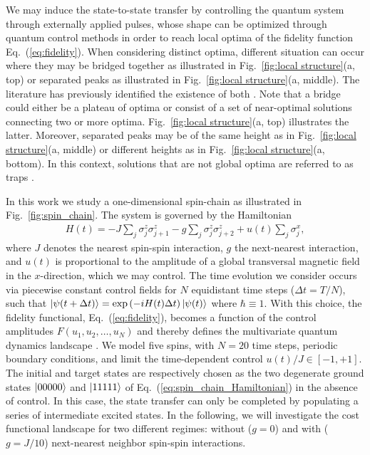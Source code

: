 \documentclass[aps, twocolumn,superscriptaddress]{revtex4-1}
\begin{document}
We may induce the state-to-state transfer by controlling the quantum system through externally applied pulses, whose shape can be optimized through quantum control methods in order to reach local optima of the fidelity function Eq.~(\ref{eq:fidelity}). When considering distinct optima, different situation can occur where they may be bridged together as illustrated in Fig.~\ref{fig:local structure}(a, top) or separated peaks as illustrated in Fig.~\ref{fig:local structure}(a, middle). The literature has previously identified the existence of both \cite{Larocca_2018, heck2018remote, larocca2020exploiting}. Note that a bridge could either be a plateau of optima or consist of a set of near-optimal solutions connecting two or more optima. Fig.~\ref{fig:local structure}(a, top) illustrates the latter. Moreover, separated peaks may be of the same height as in Fig.~\ref{fig:local structure}(a, middle) or different heights as in Fig.~\ref{fig:local structure}(a, bottom). In this context, solutions that are not global optima are referred to as traps \cite{rabitz2004quantum,pechen2011there, caneva2011chopped,de2013closer,riviello2015searching,rach2015dressing}.    

In this work we study a one-dimensional spin-chain as illustrated in Fig.~\ref{fig:spin_chain}. The system is governed by the Hamiltonian 
\begin{align}
    H(t) = -J \sum_j \sigma_j^z \sigma_{j+1}^z 
    - g \sum_j \sigma_j^z \sigma_{j+2}^z
    + u(t)\sum_j \sigma_j^x,
    \label{eq:spin_chain_Hamiltonian}
\end{align}
where $J$ denotes the nearest spin-spin interaction, $g$ the next-nearest interaction, and $u(t)$ is proportional to the amplitude of a global transversal magnetic field in the $x$-direction, which we may control. The time evolution we consider occurs via piecewise constant control fields for $N$ equidistant time steps ($\Delta t = T/N$), such that $\ket{\psi(t + \Delta t)} = \exp{(-i H(t) \Delta t)} \ket{\psi(t)}$ where $\hbar \equiv 1$. With this choice, the fidelity functional, Eq.~(\ref{eq:fidelity}), becomes a function of the control amplitudes $F(u_1,u_2,\ldots,u_N)$ and thereby defines the multivariate quantum dynamics landscape \cite{rabitz2004quantum}. We model five spins, with $N = 20$ time steps,  periodic boundary conditions, and limit the time-dependent control $u(t)/J \in [-1,+1]$. The initial and target states are respectively chosen as the two degenerate ground states $\ket{00000}$ and $\ket{11111}$ of Eq.~(\ref{eq:spin_chain_Hamiltonian}) in the absence of control. In this case, the state transfer can only be completed by populating a series of intermediate excited states. In the following, we will investigate the cost functional landscape for two different regimes: without ($g= 0$) and with ($g = J/10$) next-nearest neighbor spin-spin interactions. 
\end{document}
